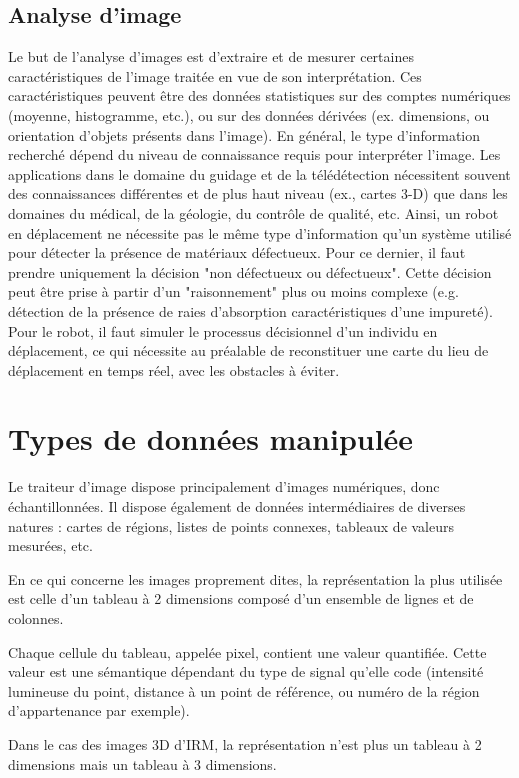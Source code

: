 \documentclass[11pt]{report}
\begin{document}
\subsection{Analyse d'image}
Le but de l’analyse d’images est d'extraire et de mesurer certaines caractéristiques
de l'image traitée en vue de son interprétation. Ces caractéristiques peuvent être des
données statistiques sur des comptes numériques (moyenne, histogramme, etc.), ou sur des
données dérivées (ex. dimensions, ou orientation d’objets présents dans l’image). En
général, le type d'information recherché dépend du niveau de connaissance requis pour
interpréter l'image. Les applications dans le domaine du guidage et de la télédétection
nécessitent souvent des connaissances différentes et de plus haut niveau (ex., cartes 3-D)
que dans les domaines du médical, de la géologie, du contrôle de qualité, etc. Ainsi, un robot
en déplacement ne nécessite pas le même type d'information qu'un système utilisé pour
détecter la présence de matériaux défectueux. Pour ce dernier, il faut prendre uniquement
la décision "non défectueux ou défectueux". Cette décision peut être prise à partir d'un
"raisonnement" plus ou moins complexe (e.g. détection de la présence de raies d'absorption
caractéristiques d'une impureté). Pour le robot, il faut simuler le processus décisionnel d’un
individu en déplacement, ce qui nécessite au préalable de reconstituer une carte du lieu de
déplacement en temps réel, avec les obstacles à éviter.
\section{Types de données manipulée}
Le
traiteur
d'image
dispose
principalement
d'images
numériques,
donc
échantillonnées. Il dispose également de données intermédiaires de diverses natures : cartes
de régions, listes de points connexes, tableaux de valeurs mesurées, etc.

En ce qui concerne les images proprement dites, la représentation la plus utilisée est
celle d'un tableau à 2 dimensions composé d'un ensemble de lignes et de colonnes.

Chaque cellule du tableau, appelée pixel, contient une valeur quantifiée. Cette valeur
est une sémantique dépendant du type de signal qu'elle code (intensité lumineuse du point,
distance à un point de référence, ou numéro de la région d'appartenance par exemple).

Dans le cas des images 3D d'IRM, la représentation n'est plus un tableau à 2 dimensions mais
un tableau à 3 dimensions.
\end{document}
